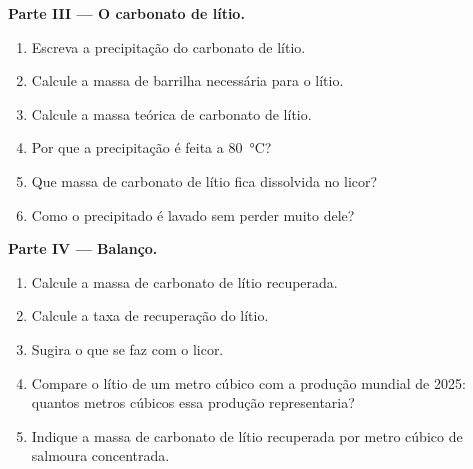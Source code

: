 \begin{problem}
\medskip
\noindent\textbf{Parte III --- O carbonato de lítio.}
\begin{enumerate}[resume]
  \item Escreva a precipitação do carbonato de lítio.
  \item Calcule a massa de barrilha necessária para o lítio.
  \item Calcule a massa teórica de carbonato de lítio.
  \item Por que a precipitação é feita a \qty{80}{\celsius}?
  \item Que massa de carbonato de lítio fica dissolvida no licor?
  \item Como o precipitado é lavado sem perder muito dele?
\end{enumerate}

\medskip
\noindent\textbf{Parte IV --- Balanço.}
\begin{enumerate}[resume]
  \item Calcule a massa de carbonato de lítio recuperada.
  \item Calcule a taxa de recuperação do lítio.
  \item Sugira o que se faz com o licor.
  \item Compare o lítio de um metro cúbico com a produção mundial de
        2025: quantos metros cúbicos essa produção representaria?
  \item Indique a massa de carbonato de lítio recuperada por metro cúbico
        de salmoura concentrada.
\end{enumerate}
\end{problem}
